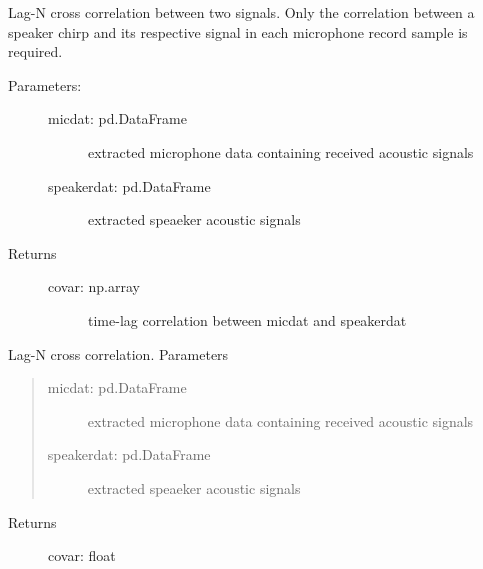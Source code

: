 \documentclass[letterpaper,10pt,english]{sphinxmanual}
\begin{document}
\begin{fulllineitems}
\label{\detokenize{code:ATom.atom_functions.covariance}}
Lag-N cross correlation between two signals.
Only the correlation between a speaker chirp and its respective
signal in each microphone record sample is required.
\begin{description}
\item[{Parameters:}] \leavevmode\begin{description}
\item[{micdat: pd.DataFrame}] \leavevmode
extracted microphone data containing received acoustic signals

\item[{speakerdat: pd.DataFrame}] \leavevmode
extracted speaeker acoustic signals

\end{description}

\item[{Returns}] \leavevmode\begin{description}
\item[{covar: np.array}] \leavevmode
time-lag correlation between micdat and speakerdat

\end{description}

\end{description}

\end{fulllineitems}


\begin{fulllineitems}
\label{\detokenize{code:ATom.atom_functions.covariance_depricated}}
Lag-N cross correlation.
Parameters
\begin{quote}
\begin{description}
\item[{micdat: pd.DataFrame}] \leavevmode
extracted microphone data containing received acoustic signals

\item[{speakerdat: pd.DataFrame}] \leavevmode
extracted speaeker acoustic signals

\end{description}
\end{quote}
\begin{description}
\item[{Returns}] \leavevmode
covar: float

\end{description}

\end{fulllineitems}
\end{document}
